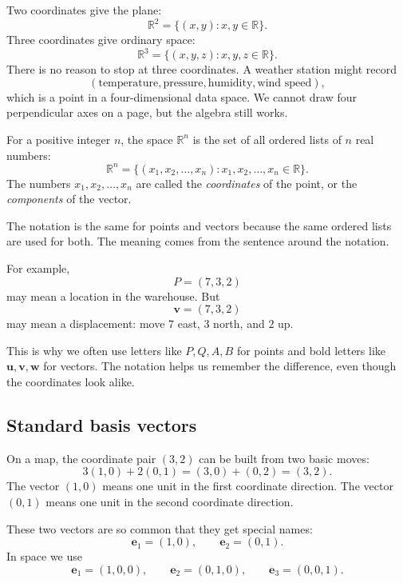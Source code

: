 Two coordinates give the plane:
\[
    \mathbb R^2=\{(x,y):x,y\in\mathbb R\}.
\]
Three coordinates give ordinary space:
\[
    \mathbb R^3=\{(x,y,z):x,y,z\in\mathbb R\}.
\]
There is no reason to stop at three coordinates.  A weather station might record
\[
    (\text{temperature},\text{pressure},\text{humidity},\text{wind speed}),
\]
which is a point in a four-dimensional data space.  We cannot draw four perpendicular
axes on a page, but the algebra still works.

\begin{definition}
For a positive integer \(n\), the space \(\mathbb R^n\) is the set of all ordered lists
of \(n\) real numbers:
\[
    \mathbb R^n
    =
    \{(x_1,x_2,\ldots,x_n):x_1,x_2,\ldots,x_n\in\mathbb R\}.
\]
The numbers \(x_1,x_2,\ldots,x_n\) are called the \emph{coordinates} of the point,
or the \emph{components} of the vector.
\end{definition}

The notation is the same for points and vectors because the same ordered lists are used
for both.  The meaning comes from the sentence around the notation.

For example,
\[
    P=(7,3,2)
\]
may mean a location in the warehouse.  But
\[
    \mathbf v=(7,3,2)
\]
may mean a displacement: move \(7\) east, \(3\) north, and \(2\) up.

This is why we often use letters like \(P,Q,A,B\) for points and bold letters like
\(\mathbf u,\mathbf v,\mathbf w\) for vectors.  The notation helps us remember the
difference, even though the coordinates look alike.

\subsection{Standard basis vectors}

On a map, the coordinate pair \((3,2)\) can be built from two basic moves:
\[
    3(1,0)+2(0,1)=(3,0)+(0,2)=(3,2).
\]
The vector \((1,0)\) means one unit in the first coordinate direction.  The vector
\((0,1)\) means one unit in the second coordinate direction.

These two vectors are so common that they get special names:
\[
    \mathbf e_1=(1,0), \qquad \mathbf e_2=(0,1).
\]
In space we use
\[
    \mathbf e_1=(1,0,0), \qquad
    \mathbf e_2=(0,1,0), \qquad
    \mathbf e_3=(0,0,1).
\]

